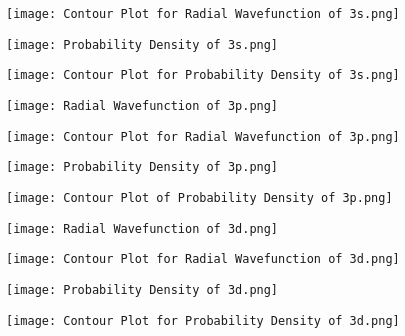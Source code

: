 \documentclass[11pt]{article}
\begin{document}
	\begin{figure}[H]
	\centering
	\texttt{[image: Contour Plot for Radial Wavefunction of 3s.png]}
	\label{figure:CRW3s}
\end{figure}

	\begin{figure}[H]
	\centering
	\texttt{[image: Probability Density of 3s.png]}
	\label{figure:PD3s}
\end{figure}	

\begin{figure}[H]
\centering
\texttt{[image: Contour Plot for Probability Density of 3s.png]}
\label{figure:CPD3s}
\end{figure}

	\begin{figure}[H]
	\centering
	\texttt{[image: Radial Wavefunction of 3p.png]}
	\label{figure:RW3p}
\end{figure}

	\begin{figure}[H]
	\centering
	\texttt{[image: Contour Plot for Radial Wavefunction of 3p.png]}
	\label{figure:CRW3p}
\end{figure}

	\begin{figure}[H]
	\centering
	\texttt{[image: Probability Density of 3p.png]}
	\label{figure:PD3p}
\end{figure}

	\begin{figure}[H]
	\centering
	\texttt{[image: Contour Plot of Probability Density of 3p.png]}
	\label{figure:CPD3p}
\end{figure}

	\begin{figure}[H]
	\centering
	\texttt{[image: Radial Wavefunction of 3d.png]}
	\label{figure:RW3d}
\end{figure}

	\begin{figure}[H]
	\centering
	\texttt{[image: Contour Plot for Radial Wavefunction of 3d.png]}
	\label{figure:CRW3d}
\end{figure}

	\begin{figure}[H]
	\centering
	\texttt{[image: Probability Density of 3d.png]}
	\label{figure:PD3d}
\end{figure}

	\begin{figure}[H]
	\centering
	\texttt{[image: Contour Plot for Probability Density of 3d.png]}
	\label{figure:CPD3d}
\end{figure}
\end{document}

